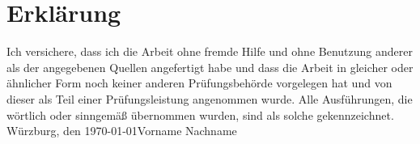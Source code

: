 \newpage

\thispagestyle{empty}
\section*{Erklärung}
\thispagestyle{empty}
Ich versichere, dass ich die Arbeit ohne fremde Hilfe und ohne Benutzung anderer als der angegebenen Quellen angefertigt habe und dass die Arbeit in gleicher oder ähnlicher Form noch keiner anderen Prüfungsbehörde vorgelegen hat und von dieser als Teil einer Prüfungsleistung angenommen wurde. Alle Ausführungen, die wörtlich oder sinngemäß übernommen wurden, sind als solche gekennzeichnet.
\vspace{4\baselineskip}\\
Würzburg, den \today \hfill Vorname Nachname 
\vspace{4\baselineskip}\\
